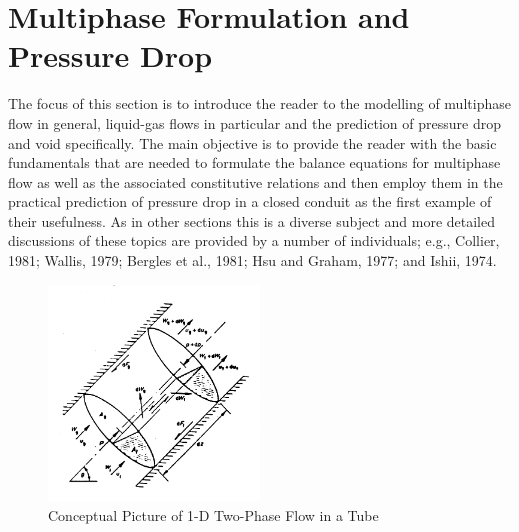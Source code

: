 \chapter{Multiphase Formulation and Pressure Drop}

The focus of this section is to introduce the reader to the modelling of multiphase flow in general, liquid-gas flows in particular and the prediction of pressure drop and void specifically.
The main objective is to provide the reader with the basic fundamentals that are needed to formulate the balance equations for multiphase flow as well as the associated constitutive relations and then employ them in the practical prediction of pressure drop in a closed conduit as the first example of their usefulness.
As in other sections this is a diverse subject and more detailed discussions of these topics are provided by a number of individuals; e.g., Collier, 1981; Wallis, 1979; Bergles et al., 1981; Hsu and Graham, 1977; and Ishii, 1974.

\begin{figure}[h]
\includegraphics[width=0.5\textwidth]{images/vertical_tube_heat_addition.png}
\caption{Conceptual Picture of 1-D Two-Phase Flow in a Tube}
\label{fig:vertical_tube_heat_addition}
\end{figure}

